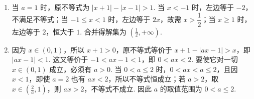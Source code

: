 \begin{solution}
\begin{enumerate}
\item 当 \(a=1\) 时，原不等式为
\(|x+1|-|x-1|>1\).
当 \(x<-1\) 时，左边等于 \(-2\)，不满足不等式；当 \(-1\leq x<1\) 时，左边等于 \(2x\)，故需 \(x>\dfrac12\)；当 \(x\geq1\) 时，左边等于 \(2\)，恒大于 \(1\). 合并得解集为
\(\left(\frac12,+\infty\right)\).
\item 因为 \(x\in(0,1)\)，所以 \(x+1>0\)，原不等式等价于
\(x+1-|ax-1|>x\)，即 \(|ax-1|<1\). 这又等价于 \(-1<ax-1<1\)，即 \(0<ax<2\).
要使它对一切 \(x\in(0,1)\) 成立，必须有 \(a>0\). 当 \(0<a\leq2\) 时，\(0<ax<a\leq2\)，且因 \(x<1\)，即使 \(a=2\) 也有 \(ax<2\)，所以不等式恒成立；若 \(a>2\)，取 \(x\in(\frac{2}{a},1)\)，则 \(ax>2\)，不等式不成立. 因此 \(a\) 的取值范围为 \(0<a\leq2\).
\end{enumerate}
\end{solution}
